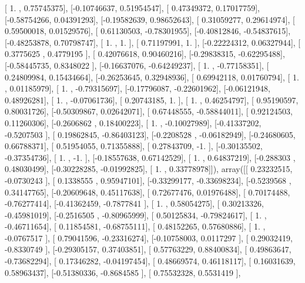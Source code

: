 \documentclass{article}
\begin{document}
       [ 1.        ,  0.75745375],
       [-0.10746637,  0.51954547],
       [ 0.47349372,  0.17017759],
       [-0.58754266,  0.04391293],
       [-0.19582639,  0.98652643],
       [ 0.31059277,  0.29614974],
       [ 0.59500018,  0.01529576],
       [ 0.61130503, -0.78301955],
       [-0.40812846, -0.54837615],
       [-0.48253878,  0.70798747],
       [ 1.        ,  1.        ],
       [ 0.71197991,  1.        ],
       [-0.22224312,  0.06327944],
       [ 0.3775625 ,  0.4779195 ],
       [ 0.42076618,  0.90460216],
       [-0.29838315, -0.62295488],
       [-0.58445735,  0.8348022 ],
       [-0.16637076, -0.64249237],
       [ 1.        , -0.77158351],
       [ 0.24809984,  0.15434664],
       [-0.26253645,  0.32948936],
       [ 0.69942118,  0.01760794],
       [ 1.        ,  0.01185979],
       [ 1.        , -0.79315697],
       [-0.17796087, -0.22601962],
       [-0.06121948,  0.48926281],
       [ 1.        , -0.07061736],
       [ 0.20743185,  1.        ],
       [ 1.        ,  0.46254797],
       [ 0.95190597,  0.80031726],
       [-0.50309867,  0.02642071],
       [ 0.67448555, -0.58844011],
       [ 0.92124503,  0.11260306],
       [-0.2606862 ,  0.18400223],
       [ 1.        , -0.10027989],
       [-0.41337202, -0.5207503 ],
       [ 0.19862845, -0.86403123],
       [-0.2208528 , -0.06182949],
       [-0.24680605,  0.66788371],
       [ 0.51954055,  0.71355888],
       [ 0.27843709, -1.        ],
       [-0.30135502, -0.37354736],
       [ 1.        , -1.        ],
       [-0.18557638,  0.67142529],
       [ 1.        ,  0.64837219],
       [-0.288303  ,  0.48030499],
       [-0.30228285, -0.01992825],
       [ 1.        ,  0.33778978]]), array([[ 0.23232515, -0.0730243 ],
       [ 0.1338555 ,  0.95947101],
       [-0.33299177, -0.33698234],
       [-0.5239568 ,  0.34147765],
       [-0.20609648,  0.45117638],
       [ 0.72677476,  0.01976488],
       [ 0.70174488, -0.76277414],
       [-0.41362459, -0.7877841 ],
       [ 1.        ,  0.58054275],
       [ 0.30213326, -0.45981019],
       [-0.2516505 , -0.80965999],
       [ 0.50125834, -0.79824617],
       [ 1.        , -0.46711654],
       [ 0.11854581, -0.68755111],
       [ 0.48152265,  0.57680886],
       [ 1.        , -0.0767517 ],
       [ 0.79041596, -0.23316274],
       [-0.10758003,  0.0117297 ],
       [ 0.29032419, -0.8330749 ],
       [-0.29305157,  0.37403851],
       [ 0.57763229,  0.88400834],
       [ 0.49863647, -0.73682294],
       [ 0.17346282, -0.04197454],
       [ 0.48669574,  0.46118117],
       [ 0.16031639,  0.58963437],
       [-0.51380336, -0.8684585 ],
       [ 0.75532328,  0.5531419 ],
\end{document}
